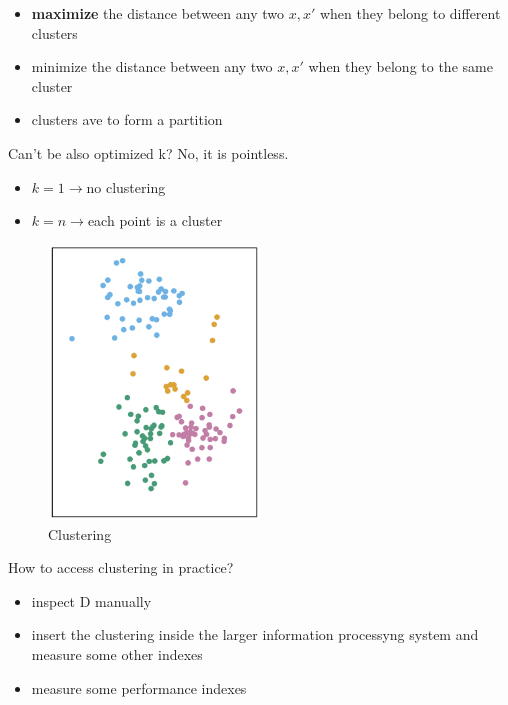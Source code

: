 \begin{itemize}
    \item \textbf{maximize} the distance between any two $x,x'$ when they belong to different clusters
    \item minimize the distance between any two $x,x'$ when they belong to the same cluster
    \item clusters ave to form a partition
\end{itemize}

Can't be also optimized k? No, it is pointless.
\begin{itemize}
    \item $k = 1 \to $no clustering
    \item $k = n \to $each point is a cluster
\end{itemize}

\begin{center}
    \begin{figure}[H]
        \centering
        \includegraphics[width=0.5\textwidth]{assets/fig35.png}
        \caption{Clustering}
    \end{figure}
\end{center}


How to access clustering in practice?
\begin{itemize}
    \item inspect D manually
    \item insert the clustering inside the larger information processyng system and measure some other indexes
    \item measure some performance indexes 
\end{itemize}

